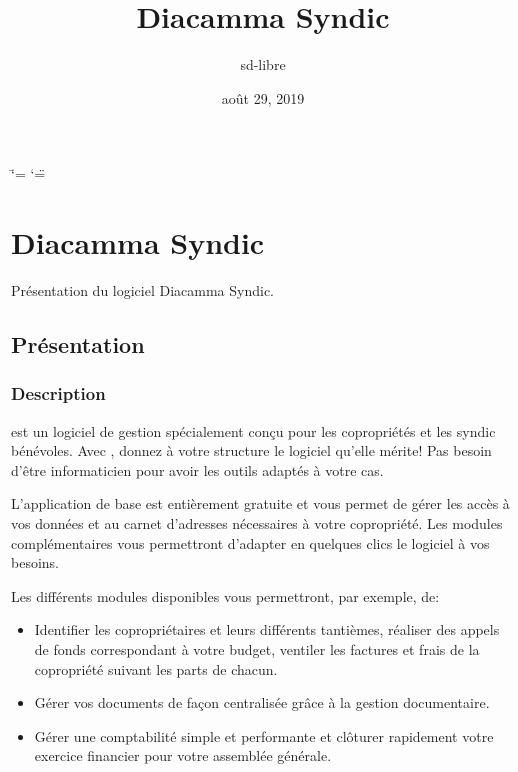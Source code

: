 \documentclass[a4paper,10pt,oneside,french]{sphinxmanual}
\title{Diacamma Syndic}
\date{août 29, 2019}
\author{sd-libre}
\begin{document}
\ifdefined\shorthandoff
  \ifnum\catcode`\=\string=\active\shorthandoff{=}\fi
  \ifnum\catcode`\"=\active{}\fi
\fi

\pagestyle{empty}
\sphinxmaketitle
\pagestyle{plain}
\sphinxtableofcontents
\pagestyle{normal}
\label{\detokenize{index::doc}}



\chapter{Diacamma Syndic}
\label{\detokenize{syndic/index:diacamma-syndic}}\label{\detokenize{syndic/index::doc}}
Présentation du logiciel Diacamma Syndic.


\section{Présentation}
\label{\detokenize{syndic/presentation:presentation}}\label{\detokenize{syndic/presentation::doc}}

\subsection{Description}
\label{\detokenize{syndic/presentation:description}}
 est un logiciel de gestion spécialement conçu pour les copropriétés et les syndic bénévoles.
Avec , donnez à votre structure le logiciel qu’elle mérite! Pas besoin d’être informaticien pour avoir les outils adaptés à votre cas.

L’application de base est entièrement gratuite et vous permet de gérer les accès à vos données et au carnet d’adresses nécessaires à votre copropriété.
Les modules complémentaires vous permettront d’adapter en quelques clics le logiciel à vos besoins.

Les différents modules disponibles vous permettront, par exemple, de:
\begin{itemize}
\item {} 
Identifier les copropriétaires et leurs différents tantièmes, réaliser des appels de fonds correspondant à votre budget, ventiler les factures et frais de la copropriété suivant les parts de chacun.

\item {} 
Gérer vos documents de façon centralisée grâce à la gestion documentaire.

\item {} 
Gérer une comptabilité simple et performante et clôturer rapidement votre exercice financier pour votre assemblée générale.

\end{itemize}
\end{document}
